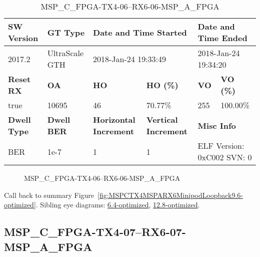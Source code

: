 \begin{table}[h]
\centering
\caption{MSP\_C\_FPGA-TX4-06--RX6-06-MSP\_A\_FPGA}
\label{tab:MSPCFPGATX406RX606MSPAFPGA9.6-optimized}
\begin{tabular}{@{}|l|l|l|l|l|l|@{}}
\toprule
\textbf{SW Version}                & \textbf{GT Type}   & \multicolumn{2}{l|}{\textbf{Date and Time Started}}            & \multicolumn{2}{l|}{\textbf{Date and Time Ended}}        \\ \midrule
2017.2                       & UltraScale GTH          & \multicolumn{2}{l|}{2018-Jan-24 19:33:49}                   & \multicolumn{2}{l|}{2018-Jan-24 19:34:20}               \\ \midrule
\textbf{Reset RX}                  & \textbf{OA} & \textbf{HO}   & \textbf{HO (\%)} & \textbf{VO} & \textbf{VO (\%)} \\ \midrule
true & 10695        & 46          & 70.77\%        & 255        & 100.00\%       \\ \midrule
\textbf{Dwell Type}                & \textbf{Dwell BER} & \textbf{Horizontal Increment} & \textbf{Vertical Increment}    & \multicolumn{2}{l|}{\textbf{Misc Info}}                  \\ \midrule
BER                            & 1e-7        & 1        & 1           & \multicolumn{2}{l|}{ELF Version: 0xC002 SVN: 0}                         \\ \bottomrule
\end{tabular}
\end{table}

\begin{figure}[h]
\caption{MSP\_C\_FPGA-TX4-06--RX6-06-MSP\_A\_FPGA} \label{fig:MSPCFPGATX406RX606MSPAFPGA9.6-optimized}
\end{figure}

Call back to summary Figure~\ref{fig:MSPCTX4MSPARX6MinipodLoopback9.6-optimized}.
Sibling eye diagrams: \hyperref[sec:MSPCFPGATX406RX606MSPAFPGA6.4-optimized]{6.4-optimized}, \hyperref[sec:MSPCFPGATX406RX606MSPAFPGA12.8-optimized]{12.8-optimized}.

\clearpage
\newpage


\subsection{MSP\_C\_FPGA-TX4-07--RX6-07-MSP\_A\_FPGA}\label{sec:MSPCFPGATX407RX607MSPAFPGA9.6-optimized}

